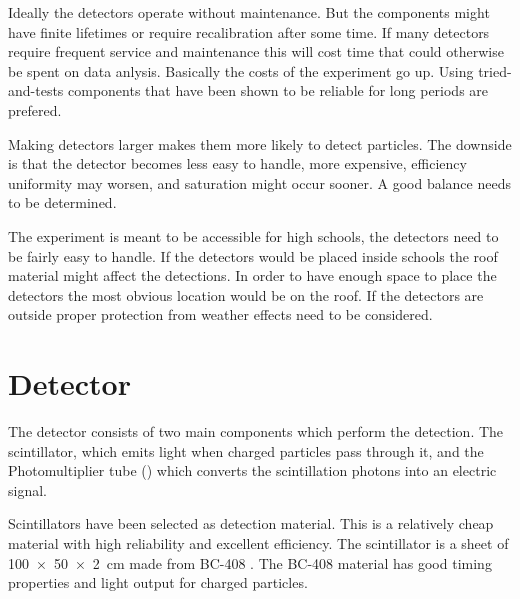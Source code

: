 Ideally the detectors operate without maintenance. But the components might have finite lifetimes or require recalibration after some time. If many detectors require frequent service and maintenance this will cost time that could otherwise be spent on data anlysis. Basically the costs of the experiment go up. Using tried-and-tests components that have been shown to be reliable for long periods are prefered.

Making detectors larger makes them more likely to detect particles. The downside is that the detector becomes less easy to handle, more expensive, efficiency uniformity may worsen, and saturation might occur sooner. A good balance needs to be determined.

The experiment is meant to be accessible for high schools, the detectors need to be fairly easy to handle. If the detectors would be placed inside schools the roof material might affect the detections. In order to have enough space to place the detectors the most obvious location would be on the roof. If the detectors are outside proper protection from weather effects need to be considered.


\section{Detector}

The detector consists of two main components which perform the detection. The scintillator, which emits light when charged particles pass through it, and the Photomultiplier tube (\pmt) which converts the scintillation photons into an electric signal.

Scintillators have been selected as detection material. This is a relatively cheap material with high reliability and excellent efficiency. The scintillator is a sheet of \SI[product-units=power]{100 x 50 x 2}{\centi\meter} made from BC-408 \cite{bc408}. The BC-408 material has good timing properties and light output for charged particles.

